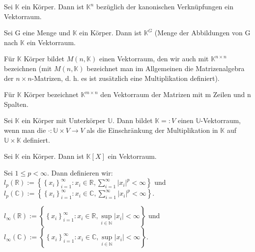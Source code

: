 \documentclass[10pt]{scrbook}
\begin{document}
\begin{Bsp}
Sei $\mathbb{K}$ ein Körper. Dann ist $\mathbb{K}^n$ bezüglich der kanonischen Verknüpfungen ein Vektorraum.
\end{Bsp}

\begin{Bsp}
Sei G eine Menge und $\mathbb{K}$ ein Körper. Dann ist $\mathbb{K}^G$ (Menge der Abbildungen von G nach $\mathbb{K}$ ein Vektorraum.
\end{Bsp}

\begin{Bsp}
Für $\mathbb{K}$ Körper bildet $M(n, \mathbb{K})$ einen Vektorraum, den wir auch mit $\mathbb{K}^{n\times n}$ bezeichnen (mit $M(n, \mathbb{K})$ bezeichnet man im Allgemeinen die Matrizenalgebra der $n\times n$-Matrizen, d. h. es ist zusätzlich eine Multiplikation definiert).
\end{Bsp}

\begin{Bsp}
Für $\mathbb{K}$ Körper bezeichnet $\mathbb{K}^{m\times n}$ den Vektorraum der Matrizen mit m Zeilen und n Spalten.
\end{Bsp}

\begin{Bsp}
Sei $\mathbb{K}$ ein Körper mit Unterkörper $\mathbb{U}$. Dann bildet $\mathbb{K}=:V$ einen $\mathbb{U}$-Vektorraum, wenn man die $\cdot: \mathbb{U}\times V\rightarrow V$ als die Einschränkung der Multiplikation in $\mathbb{K}$ auf $\mathbb{U}\times \mathbb{K}$ definiert.
\end{Bsp}

\begin{Bsp}
Sei $\mathbb{K}$ ein Körper. Dann ist $\mathbb{K}[X]$ ein Vektorraum.
\end{Bsp}

\begin{Bsp}
Sei $1\leq p<\infty$. Dann definieren wir: $l_p(\mathbb{R}):= \left\{\left\{x_i\right\}_{i=1}^\infty: x_i\in\mathbb{R}, \sum\limits_{i=1}^\infty{\left|x_i\right|^p}<\infty\right\}$ und $l_p(\mathbb{C}):= \left\{\left\{x_i\right\}_{i=1}^\infty: x_i\in\mathbb{C}, \sum\limits_{i=1}^\infty{\left|x_i\right|^p}<\infty\right\}$.
\end{Bsp}

\begin{Bsp}
$l_\infty(\mathbb{R}):= \left\{\left\{x_i\right\}_{i=1}^\infty: x_i\in\mathbb{R}, \sup\limits_{i\in\mathbb{N}}{\left|x_i\right|}<\infty\right\}$ und $l_\infty(\mathbb{C}):= \left\{\left\{x_i\right\}_{i=1}^\infty: x_i\in\mathbb{C}, \sup\limits_{i\in\mathbb{N}}{\left|x_i\right|}<\infty\right\}$.
\end{Bsp}
\end{document}
